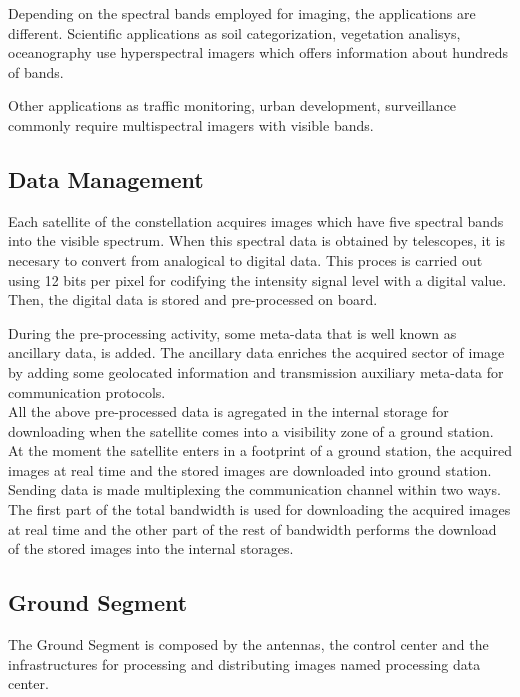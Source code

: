 Depending on the spectral bands employed for imaging, the applications are
different. Scientific applications as soil categorization, vegetation analisys,
oceanography use hyperspectral imagers which offers information about hundreds
of bands. 

Other applications as traffic monitoring, urban development,
surveillance commonly require multispectral imagers with visible bands.

\subsection{Data Management}

Each satellite of the constellation acquires images which have five spectral
bands into the visible spectrum. When this spectral data is
obtained by telescopes, it is necesary to convert from analogical to digital
data. This proces is carried out using 12 bits per pixel for codifying the
intensity signal level with a digital value. Then, the digital data is stored and pre-processed on
board. 

During the pre-processing activity, some meta-data that is well known as ancillary
data, is added. The ancillary data enriches the acquired sector of image by adding
some geolocated information and transmission auxiliary meta-data for communication
protocols. \\All the above pre-processed data is agregated in the
internal storage for downloading when the satellite comes into a visibility zone
of a ground station. At the moment the satellite enters in a footprint of a
ground station, the acquired images at real time and the stored images are
downloaded into ground station. \\Sending data is made multiplexing the
communication channel within two ways. The first part of the total bandwidth
is used for downloading the acquired images at real time and the other part of
the rest of bandwidth performs the download of the stored images into the
internal storages.

\subsection{Ground Segment}

The Ground Segment is composed by the antennas, the control center and the
infrastructures for processing and distributing images named processing
data center. 

